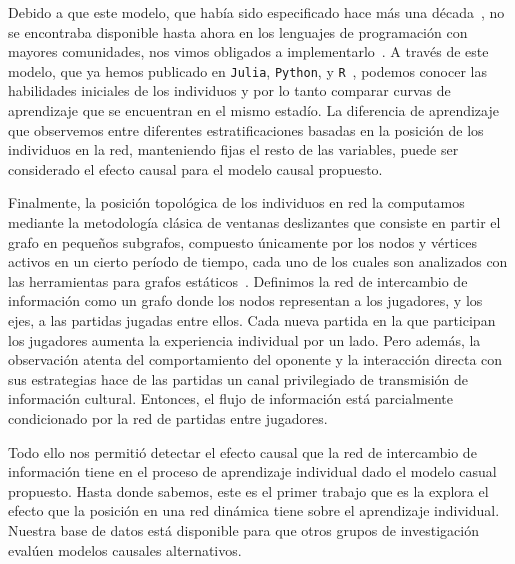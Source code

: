 \documentclass[a4paper,11pt]{book}
\theoremstyle{definition}
\begin{document}
Debido a que este modelo, que había sido especificado hace más una década~\cite{Dangauthier2007}, no se encontraba disponible hasta ahora en los lenguajes de programación con mayores comunidades, nos vimos obligados a implementarlo~\cite{Landfried2021-TTT}.
%
A través de este modelo, que ya hemos publicado en \texttt{Julia}, \texttt{Python}, y \texttt{R}~\cite{Landfried2021-TTT}, podemos conocer las habilidades iniciales de los individuos y por lo tanto comparar curvas de aprendizaje que se encuentran en el mismo estadío.
%
La diferencia de aprendizaje que observemos entre diferentes estratificaciones basadas en la posición de los individuos en la red, manteniendo fijas el resto de las variables, puede ser considerado el efecto causal para el modelo causal propuesto.

Finalmente, la posición topológica de los individuos en red la computamos mediante la metodología clásica de ventanas deslizantes que consiste en partir el grafo en pequeños subgrafos, compuesto únicamente por los nodos y vértices activos en un cierto período de tiempo, cada uno de los cuales son analizados con las herramientas para grafos estáticos~\cite{Kossinets2006}.
%
Definimos la red de intercambio de información como un grafo donde los nodos representan a los jugadores, y los ejes, a las partidas jugadas entre ellos.
%
Cada nueva partida en la que participan los jugadores aumenta la experiencia individual por un lado.
Pero además, la observación atenta del comportamiento del oponente y la interacción directa con sus estrategias hace de las partidas un canal privilegiado de transmisión de información cultural.
%
Entonces, el flujo de información está parcialmente condicionado por la red de partidas entre jugadores.

Todo ello nos permitió detectar el efecto causal que la red de intercambio de información tiene en el proceso de aprendizaje individual dado el modelo casual propuesto.
%
%
Hasta donde sabemos, este es el primer trabajo que es la explora el efecto que la posición en una red dinámica tiene sobre el aprendizaje individual.
%
Nuestra base de datos está disponible para que otros grupos de investigación evalúen modelos causales alternativos.
\end{document}
